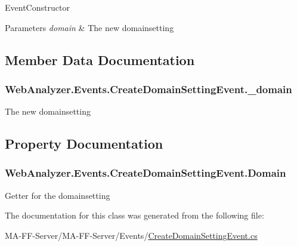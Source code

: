 Event\+Constructor 


\begin{DoxyParams}{Parameters}
{\em domain} & The new domainsetting\\
\hline
\end{DoxyParams}


\subsection{Member Data Documentation}
\hypertarget{class_web_analyzer_1_1_events_1_1_create_domain_setting_event_a5b8ba22cce1bd494bd41634f6338801e}{}
\subsubsection[{\+\_\+domain}]{ Web\+Analyzer.\+Events.\+Create\+Domain\+Setting\+Event.\+\_\+domain\hspace{0.3cm}{\ttfamily [private]}}\label{class_web_analyzer_1_1_events_1_1_create_domain_setting_event_a5b8ba22cce1bd494bd41634f6338801e}


The new domainsetting 



\subsection{Property Documentation}
\hypertarget{class_web_analyzer_1_1_events_1_1_create_domain_setting_event_a38563439a3da6789afcb3dc1e3fb30e3}{}
\subsubsection[{Domain}]{ Web\+Analyzer.\+Events.\+Create\+Domain\+Setting\+Event.\+Domain\hspace{0.3cm}{\ttfamily [get]}}\label{class_web_analyzer_1_1_events_1_1_create_domain_setting_event_a38563439a3da6789afcb3dc1e3fb30e3}


Getter for the domainsetting 



The documentation for this class was generated from the following file\+:\begin{DoxyCompactItemize}
\item 
M\+A-\/\+F\+F-\/\+Server/\+M\+A-\/\+F\+F-\/\+Server/\+Events/\hyperlink{_create_domain_setting_event_8cs}{Create\+Domain\+Setting\+Event.\+cs}\end{DoxyCompactItemize}
